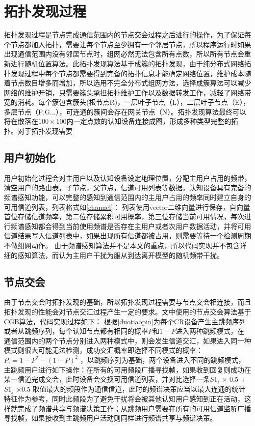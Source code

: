 \documentclass[a4paper,AutoFakeBold,oneside,12pt]{book}
\begin{document}
 \section{拓扑发现过程}
 拓扑发现过程是节点完成通信范围内的节点交会过程之后进行的操作，为了保证每个节点都加入拓扑，需要让每个节点至少拥有一个邻居节点，所以程序运行时如果出现通信范围内没有邻居节点时，组网必然无法包含所有点数，所以所有节点会重新进行随机位置算法。此拓扑发现算法基于成簇的拓扑发现，由于纯分布式网络拓扑发现过程中每个节点都需要得到完备的拓扑信息才能确定网络位置，维护成本随着节点数目增多而增加，所以选用不完全分布式组网方法，选择成簇算法可以减少网络的维护开销，只需要簇头承担拓扑维护工作以及数据转发工作，减轻了网络带宽的消耗。每个簇包含簇头(根节点R)，一层叶子节点（L），二层叶子节点（E），多层节点（F,G...），可连通的簇间会存在网关节点（N）。拓扑发现算法最终可以将在散落在$100\times 100$内一定点数的认知设备连接成图，形成多种类型完整的拓扑。对于拓扑发现需要
 \subsection{用户初始化}
 用户初始化过程会对主用户以及认知设备设定地理位置，分配主用户占用的频带，清空用户的路由表，子节点，父节点，信道可用列表等数据。认知设备具有完备的频谱感知功能，可以完整的感知到通信范围内的主用户占用的频率同时建立自身的可用信道列表，列表格式如\ref{channel}：
 列表使用vector二维向量进行保存，自向量首位存储信道频率，第二位存储累积可用概率，第三位存储当前可用情况，每次进行频谱感知都会得到当前使用频谱是否存在主用户或者次用户数据活动，并将可用信道结果写入信道列表中，如果出现所有信道都被占用，则需要等待一个检测周期不做组网动作。
 由于频谱感知算法并不是本文的重点，所以代码实现并不包含详细的感知算法，而认为主用户干扰为服从到达离开模型的随机频带干扰。
 \subsection{节点交会}
 由于节点交会时拓扑发现的基础，所以拓扑发现过程需要与节点交会相连接，而且拓扑发现的性能会对节点交汇过程产生一定的要求。文中使用的节点交会算法基于CGB算法，代码实现过程如下：
 根据\ref{duotiaopin}为每个CR设备产生主跳频序列或者从跳频序列，每个认知节点都有相同的概率$P$和$1-P$进入两种跳频模式，在通信范围内的两个节点分别进入两种模式中，则会发生信道交汇，如果进入同一种模式则很大可能无法检测，成功交汇概率即选择不同模式的概率：$P_i=1-P^2-(1-P)^2$
，以跳频序列为基础，两个设备进入不同的跳频模式，主跳频用户进行如下操作：在所有的可用频段广播寻找帧，如果收到回复则成功在某一信道完成交会，此时设备会交换可用信道列表，并对比选择一条$S1_i$ $\times$ 0.5 +$S1_j$ $ \times $0.5 取值最大的频段作为通信信道，此时的频谱决策应当以最大连通的统计特征作为参考，同时此频段为了避免干扰将会被其他认知用户感知到正在活动，这样就完成了频谱共享与频谱决策工作；从跳频用户需要在所有的可用信道监听广播寻找帧，如果接收到主跳频用户活动则同样进行频谱共享与频谱决策。
  
\end{document}
